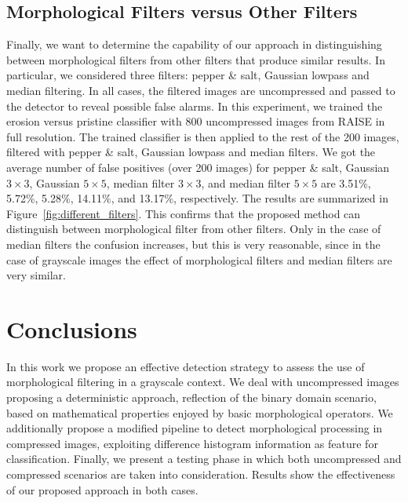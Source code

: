 \documentclass{ieeeaccess}
\begin{document}
\subsection{Morphological Filters versus Other Filters }
\label{subsec:results_different_filters}

Finally, we want to determine the capability of our approach in distinguishing between morphological filters from other filters that produce similar results. In particular, we considered three filters: pepper \& salt, Gaussian lowpass and median filtering. In all cases, the filtered images are uncompressed and passed to the detector to reveal possible false alarms. 
In this experiment, we trained the erosion versus pristine classifier with 800 uncompressed images from RAISE in full resolution. The trained classifier is then applied to the rest of the 200 images, filtered with pepper \& salt, Gaussian lowpass and median filters. We got the average number of false positives (over 200 images) for pepper \& salt, Gaussian $3 \times 3$, Gaussian $5 \times 5$, median filter $3 \times 3$, and median filter $5 \times 5$ are 3.51\%, 5.72\%, 5.28\%, 14.11\%, and 13.17\%, respectively. The results are summarized in Figure~\ref{fig:different_filters}.  
This confirms that the proposed method can distinguish between morphological filter from other filters. Only in the case of median filters the confusion increases, but this is very reasonable, since in the case of grayscale images the effect of morphological filters and median filters are very similar.


\section{Conclusions}
\label{sec:conclusions}
In this work we propose an effective detection strategy to assess the use of morphological filtering in a grayscale context. We deal with uncompressed images proposing a deterministic approach, reflection of the binary domain scenario, based on mathematical properties enjoyed by basic morphological operators. We additionally propose a modified pipeline to detect morphological processing in compressed images, exploiting difference histogram information as feature for  classification. Finally, we present a testing phase in which both uncompressed and compressed scenarios are taken into consideration. Results show the effectiveness of our proposed approach in both cases.  
\end{document}

